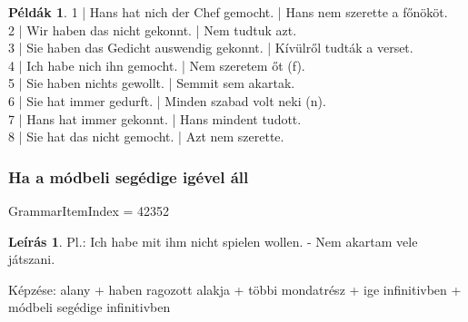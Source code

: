\documentclass{article}
\theoremstyle{definition}
\newtheorem*{exmp}{Példák}
\newtheorem*{desc}{Leírás}
\begin{document}
\begin{exmp}
1 | Hans hat nich der Chef gemocht. | Hans nem szerette a főnököt.\\
2 | Wir haben das nicht gekonnt. | Nem tudtuk azt.\\
3 | Sie haben das Gedicht auswendig gekonnt. | Kívülről tudták a verset.\\
4 | Ich habe nich ihn gemocht. | Nem szeretem őt (f).\\
5 | Sie haben nichts gewollt. | Semmit sem akartak.\\
6 | Sie hat immer gedurft. | Minden szabad volt neki (n).\\
7 | Hans hat immer gekonnt. | Hans mindent tudott.\\
8 | Sie hat das nicht gemocht. | Azt nem szerette.\\
\end{exmp}

\subsubsection{Ha a módbeli segédige igével áll}

GrammarItemIndex = 42352

\begin{desc}
Pl.: Ich habe mit ihm nicht spielen wollen. - Nem akartam vele játszani.

Képzése:
alany + haben ragozott alakja + többi mondatrész + ige infinitivben + módbeli segédige infinitivben
\end{desc}
\end{document}
